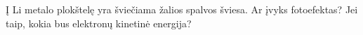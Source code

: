 \question Į Li metalo plokštelę yra šviečiama žalios spalvos šviesa. Ar įvyks fotoefektas? Jei taip, kokia bus elektronų kinetinė energija?